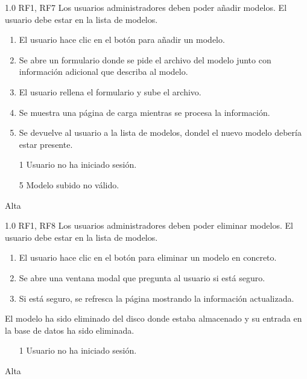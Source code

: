{1.0}
{RF1, RF7}
{Los usuarios administradores deben poder añadir modelos.}
{El usuario debe estar en la lista de modelos.}
{
    \begin{enumerate}
        \def\labelenumi{\arabic{enumi}.}
        \tightlist
        \item El usuario hace clic en el botón para añadir un modelo.
        \item Se abre un formulario donde se pide el archivo del modelo junto
              con información adicional que describa al modelo.
        \item El usuario rellena el formulario y sube el archivo.
        \item Se muestra una página de carga mientras se procesa la información.
        \item Se devuelve al usuario a la lista de modelos, dondel el nuevo
              modelo debería estar presente.
    \end{enumerate}
}
{}
{
    \begin{itemize}
        \item [1] Usuario no ha iniciado sesión.
        \item [5] Modelo subido no válido.
    \end{itemize}
}
{Alta}

{1.0}
{RF1, RF8}
{Los usuarios administradores deben poder eliminar modelos.}
{El usuario debe estar en la lista de modelos.}
{
    \begin{enumerate}
        \def\labelenumi{\arabic{enumi}.}
        \tightlist
        \item El usuario hace clic en el botón para eliminar un modelo en concreto.
        \item Se abre una ventana modal que pregunta al usuario si está seguro.
        \item Si está seguro, se refresca la página mostrando la información actualizada.
    \end{enumerate}
}
{
    El modelo ha sido eliminado del disco donde estaba almacenado y su entrada en
    la base de datos ha sido eliminada.
}
{
    \begin{itemize}
        \item [1] Usuario no ha iniciado sesión.
    \end{itemize}
}
{Alta}

